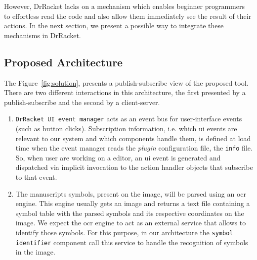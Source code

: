 However, DrRacket lacks on a mechanism which enables beginner programmers to effortless read the code and also allow them immediately see the result of their actions. In the next section, we present a possible way to integrate these mechanisms in DrRacket.

\subsection{Proposed Architecture}

The Figure~\ref{fig:solution}, presents a publish-subscribe view of the proposed tool. There are two different interactions in this architecture, the first presented by a publish-subscribe and the second by a client-server.

\begin{enumerate}
	\item \texttt{DrRacket UI event manager} acts as an event bus for user-interface events (such as button clicks). Subscription information, i.e. which \ac{ui} events are relevant to our system and which components handle them, is defined at load time when the event manager reads the \textit{plugin} configuration file, the \texttt{info} file. So, when user are working on a editor, an \ac{ui} event is generated and dispatched via implicit invocation to the action handler objects that subscribe to that event.

	\item The manuscripts symbols, present on the image, will be parsed using an \ac{ocr} engine. This engine usually gets an image and returns a text file containing a symbol table with the parsed symbols and its respective coordinates on the image. We expect the \ac{ocr} engine to act as an external service that allows to identify those symbols. For this purpose, in our architecture the \texttt{symbol identifier} component call this service to handle the recognition of symbols in the image.
\end{enumerate}

